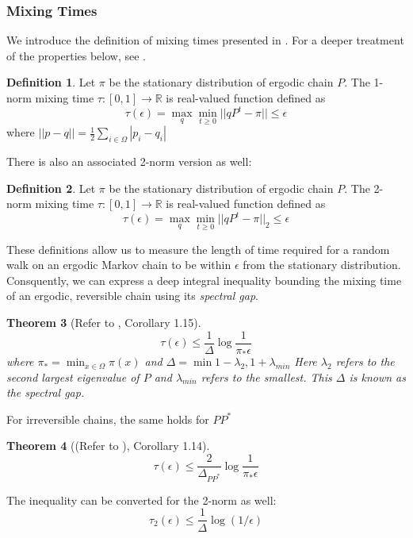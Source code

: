 \documentclass[12pt]{amsart}
\newtheorem{theorem}{Theorem}[section]
\theoremstyle{definition}
\newtheorem{definition}[theorem]{Definition}
\theoremstyle{remark}
\numberwithin{equation}{section}
\theoremstyle{remark}
\begin{document}
\subsubsection{Mixing Times}
We introduce the definition of mixing times presented in \cite{harrlow}. For a deeper treatment of the properties below, see \cite{montenegro}.
%
\begin{definition}
  Let $\pi$ be the stationary distribution of ergodic chain $P$. The 1-norm mixing time $\tau:[0,1] \rightarrow \mathbb{R}$ is real-valued function defined as
  \begin{equation}
    \tau(\epsilon) = \max_q \min_{t \geq 0} ||qP^t - \pi|| \leq \epsilon
  \end{equation}
  where $||p-q|| = \frac{1}{2}\sum_{i \in \Omega} |p_i - q_i|$
\end{definition}
%
\noindent  There is also an associated 2-norm version as well:
%
\begin{definition}
  Let $\pi$ be the stationary distribution of ergodic chain $P$. The 2-norm mixing time $\tau:[0,1] \rightarrow \mathbb{R}$ is real-valued function defined as
  \begin{equation}
    \tau(\epsilon) = \max_q \min_{t \geq 0} ||qP^t - \pi||_2 \leq \epsilon
  \end{equation}
\end{definition}
%
\noindent These definitions allow us to measure the length of time required for a random walk on an ergodic Markov chain to be within $\epsilon$ from the stationary distribution. Consquently, we can express a deep integral inequality bounding the mixing time of an ergodic, reversible chain using its \emph{spectral gap}.
%
\begin{theorem}[Refer to \cite{montenegro}, Corollary 1.15] \label{spectralgap}
  \begin{equation}
    \tau(\epsilon) \leq \frac{1}{\Delta}\log\frac{1}{\pi_*\epsilon}
  \end{equation}
  where $\pi_* = \min_{x \in \Omega} \pi(x)$ and $\Delta = \min{1 - \lambda_2, 1 + \lambda_{min}}$ Here $\lambda_2$ refers to the second largest eigenvalue of $P$ and $\lambda_{min}$ refers to the smallest. This $\Delta$ is known as the spectral gap.
\end{theorem}
\noindent For irreversible chains, the same holds for $PP^*$
%
\begin{theorem}[(Refer to \cite{montenegro}), Corollary 1.14]
  \begin{equation}
    \tau(\epsilon) \leq \frac{2}{\Delta_{PP^*}}\log\frac{1}{\pi_*\epsilon}
  \end{equation}
\end{theorem}
\noindent The inequality can be converted for the 2-norm as well:
%
\begin{equation} \label{2spectralgap}
  \tau_2(\epsilon) \leq \frac{1}{\Delta}\log(1/\epsilon)
\end{equation}
\end{document}
